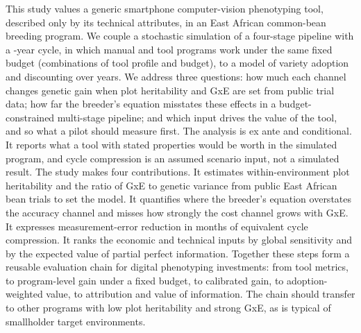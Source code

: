 This study values a generic smartphone computer-vision phenotyping tool, described only by its technical attributes, in an East African common-bean breeding program. We couple a stochastic simulation of a four-stage pipeline with a \NumCfgCycleYears-year cycle, in which manual and tool programs work under the same fixed budget (\NumNcellsOK combinations of tool profile and budget), to a model of variety adoption and discounting over \NumCfgHorizon years. We address three questions: how much each channel changes genetic gain when plot heritability and GxE are set from public trial data; how far the breeder's equation misstates these effects in a budget-constrained multi-stage pipeline; and which input drives the value of the tool, and so what a pilot should measure first. The analysis is ex ante and conditional. It reports what a tool with stated properties would be worth in the simulated program, and cycle compression is an assumed scenario input, not a simulated result. The study makes four contributions. It estimates within-environment plot heritability and the ratio of GxE to genetic variance from public East African bean trials to set the model. It quantifies where the breeder's equation overstates the accuracy channel and misses how strongly the cost channel grows with GxE. It expresses measurement-error reduction in months of equivalent cycle compression. It ranks the economic and technical inputs by global sensitivity and by the expected value of partial perfect information. Together these steps form a reusable evaluation chain for digital phenotyping investments: from tool metrics, to program-level gain under a fixed budget, to calibrated gain, to adoption-weighted value, to attribution and value of information. The chain should transfer to other programs with low plot heritability and strong GxE, as is typical of smallholder target environments.
